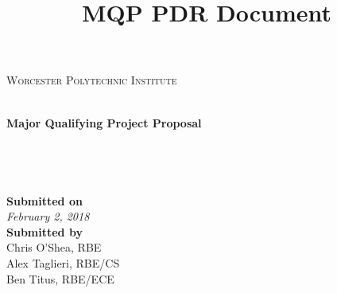 \documentclass[letterpaper,12pt,titlepage]{article}
\title{MQP PDR Document}
\begin{document}
\begin{titlepage}
\begin{center}
\begin{minipage}{0.4\textwidth}
\end{minipage}
\begin{minipage}{0.5\textwidth}
\centering
\textsc{Worcester Polytechnic Institute}
\end{minipage}
\\ 
\vspace*{1cm}
	\Huge
	\textbf{Major Qualifying Project Proposal}\\
\vspace{1cm}
	\LARGE
	\\
\vspace{2cm}
	\Large
	\text{}\\
    \textbf{}\\
    \textbf{}\\
\vfill
\vspace{0.8cm}
	\LARGE
	\textbf{Submitted on} \\
    \Large
	\textit{February 2, 2018} \\
    
\vspace{0.8cm}
	\LARGE
	\textbf{Submitted by} \\
    \Large
	Chris O'Shea, RBE\\
	\Large
    Alex Taglieri, RBE/CS \\
	\Large
    Ben Titus, RBE/ECE \\
    
\vfill
\end{center}
\end{titlepage}

\newpage
  \tableofcontents
\newpage







% 
% 
% 

\pagebreak
{}

% 
% 

\appendices
% 

\end{document}
